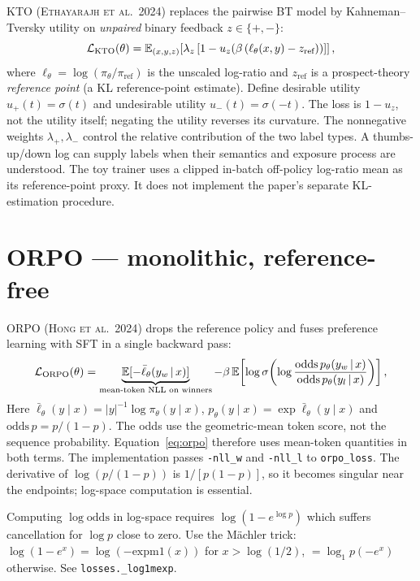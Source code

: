 \documentclass[11pt,oneside]{scrbook}
\begin{document}
KTO (\textsc{Ethayarajh et al.\ 2024}) replaces the pairwise BT model
by Kahneman--Tversky utility on \emph{unpaired} binary feedback
$z \in \{+, -\}$:
\begin{equation}
\mathcal{L}_{\text{KTO}}(\theta) =
  \mathbb{E}_{(x, y, z)}\!\left[\lambda_z \left[1-u_z\!\left(\beta\,(\ell_\theta(x, y) - z_{\text{ref}})\right)\right]\right],
\label{eq:kto}
\end{equation}
where $\ell_\theta=\log(\pi_\theta/\pi_{\mathrm{ref}})$ is the unscaled log-ratio and $z_{\text{ref}}$ is a prospect-theory \emph{reference point}
(a KL reference-point estimate). Define desirable utility
$u_+(t)=\sigma(t)$ and undesirable utility $u_-(t)=\sigma(-t)$.
The loss is $1-u_z$, not the utility itself; negating the utility reverses
its curvature. The nonnegative weights $\lambda_+,\lambda_-$ control the
relative contribution of the two label types. A thumbs-up/down log can
supply labels when their semantics and exposure process are understood.
The toy trainer uses a clipped in-batch off-policy log-ratio mean as its
reference-point proxy. It does not implement the paper's separate
KL-estimation procedure.

\section{ORPO --- monolithic, reference-free}

ORPO (\textsc{Hong et al.\ 2024}) drops the reference policy and fuses
preference learning with SFT in a single backward pass:
\begin{equation}
\mathcal{L}_{\text{ORPO}}(\theta) =
  \underbrace{\mathbb{E}[-\bar\ell_\theta(y_w \,\vert\, x)]}_{\text{mean-token NLL on winners}}
  - \beta\,\mathbb{E}\!\left[\log\sigma\!\left(\log\frac{\mathrm{odds}\,p_\theta(y_w \,\vert\, x)}{\mathrm{odds}\,p_\theta(y_l \,\vert\, x)}\right)\right],
\label{eq:orpo}
\end{equation}
Here $\bar\ell_\theta(y\mid x)=|y|^{-1}\log\pi_\theta(y\mid x)$,
$p_\theta(y\mid x)=\exp\bar\ell_\theta(y\mid x)$ and
$\mathrm{odds}\,p=p/(1-p)$. The odds use the geometric-mean token score,
not the sequence probability. Equation~\eqref{eq:orpo} therefore uses mean-token quantities in both terms. The implementation
passes \texttt{-nll\_w} and \texttt{-nll\_l} to \texttt{orpo\_loss}.
The derivative of $\log(p/(1-p))$ is $1/[p(1-p)]$, so it becomes
singular near the endpoints; log-space computation is essential.

\begin{remark}
Computing $\log\mathrm{odds}$ in log-space requires
$\log(1 - e^{\log p})$ which suffers cancellation for $\log p$ close to zero.
Use the Mächler trick:
$\log(1 - e^x) = \log(-\mathrm{expm1}(x))$ for $x > \log(1/2)$,
$= \log_1p(-e^x)$ otherwise.
See \texttt{losses.\_log1mexp}.
\end{remark}
\end{document}
